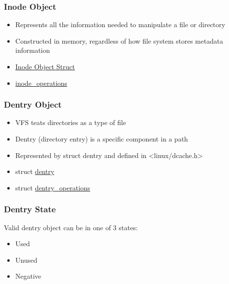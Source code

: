 \begin{frame}[fragile]
    \frametitle{Inode Object}


    \begin{itemize}
        \item Represents all the information needed to manipulate a file or directory
        \item Constructed in memory, regardless of how file system stores metadata information
        \item \href{https://elixir.bootlin.com/linux/latest/source/include/linux/fs.h\#L610}{Inode Object Struct}
        \item \href{https://elixir.bootlin.com/linux/latest/source/include/linux/fs.h\#L1862}{inode\_operations}
    \end{itemize}
% 
\end{frame}
\begin{frame}[fragile]
    \frametitle{Dentry Object}


    \begin{itemize}
        \item VFS teats directories as a type of file
        \item Dentry (directory entry) is a specific component in a path
        \item Represented by struct dentry and defined in <linux/dcache.h>
        \item struct \href{https://elixir.bootlin.com/linux/v5.7-rc4/source/include/linux/dcache.h\#L89}{dentry}
        \item struct \href{https://elixir.bootlin.com/linux/v5.7-rc4/source/include/linux/dcache.h\#L135}{dentry\_operations}
    \end{itemize}
% 
\end{frame}
\begin{frame}[fragile]
    \frametitle{Dentry State}

% 
Valid dentry object can be in one of 3 states:

    \begin{itemize}
        \item Used
        \item Unused
        \item Negative
    \end{itemize}
% 
\end{frame}
